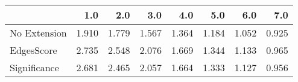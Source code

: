 \begin{tabular}{lrrrrrrr}
\toprule
{} &   1.0 &   2.0 &   3.0 &   4.0 &   5.0 &   6.0 &   7.0 \\
\midrule
No Extension & 1.910 & 1.779 & 1.567 & 1.364 & 1.184 & 1.052 & 0.925 \\
EdgesScore   & 2.735 & 2.548 & 2.076 & 1.669 & 1.344 & 1.133 & 0.965 \\
Significance & 2.681 & 2.465 & 2.057 & 1.664 & 1.333 & 1.127 & 0.956 \\
\bottomrule
\end{tabular}
